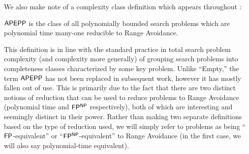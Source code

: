 We also make note of a complexity class definition which appears throughout \cite{total,Korten21}:
\begin{definition}
$\cl{APEPP}$ is the class of all polynomially bounded search problems which are polynomial time many-one reducible to Range Avoidance.
\end{definition}
This definition is in line with the standard practice in total search problem complexity (and complexity more generally) of grouping search problems into completeness classes characterized by some key problem. Unlike ``{\sc Empty},'' the term $\cl{APEPP}$ has not been replaced in subsequent work, however it has mostly fallen out of use. This is primarily due to the fact that there are two distinct notions of reduction that can be used to reduce problems to Range Avoidance (polynomial time and $\cl{FP^{NP}}$ respectively), both of which are interesting and seemingly distinct in their power. Rather than making two separate definitions based on the type of reduction used, we will simply refer to problems as being  ``$\cl{FP}$-equivalent'' or ``$\cl{FP^{NP}}$-equivalent'' to Range Avoidance (in the first case, we will also say polynomial-time equivalent). 

